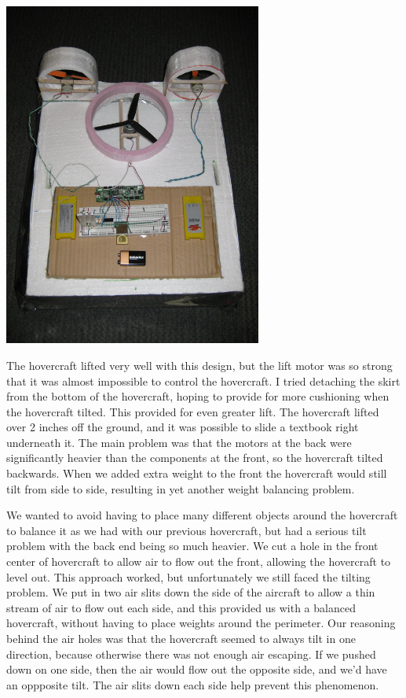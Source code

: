 \begin{center}
  \includegraphics[width=85mm]{imageSources/designProblemsnew_weight.png}
\end{center}
\label{new_weight}

The hovercraft lifted very well with this design, but the lift motor was so strong that it was almost impossible to control
the hovercraft. I tried detaching the skirt from the bottom of the hovercraft, hoping to provide for more cushioning when
the hovercraft tilted. This provided for even greater lift. The hovercraft lifted over 2 inches off the ground, and it was
possible to slide a textbook right underneath it. The main
problem was that the motors at the back were significantly heavier than the components at the front, so the hovercraft
tilted backwards. When we added extra weight to the front the hovercraft would still tilt from side to side, resulting
in yet another weight balancing problem.

We wanted to avoid having to place many different objects around the hovercraft to balance it as we had with our previous
hovercraft, but had a serious tilt problem with the back end being so much heavier. We cut a hole in the front center of 
hovercraft to allow air to flow out the front, allowing the hovercraft to level out. This approach worked, but unfortunately
we still faced the tilting problem. We put in two air slits down the side of the aircraft to allow a thin stream of air
to flow out each side, and this provided us with a balanced hovercraft, without having to place weights around the perimeter.
Our reasoning behind the air holes was that the hovercraft seemed to always tilt in one direction, because otherwise there
was not enough air escaping. If we pushed down on one side, then the air would flow out the opposite side, and we'd have 
an oppposite tilt. The air slits down each side help prevent this phenomenon.

